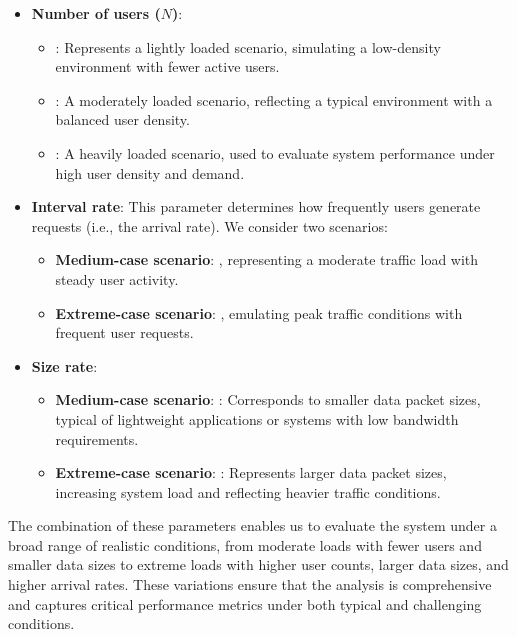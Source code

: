 \documentclass{report}
\begin{document}
\begin{itemize}
    \item \textbf{Number of users ($N$)}:
    \begin{itemize}
        \item {}: Represents a lightly loaded scenario, simulating a low-density environment with fewer active users.
        \item {}: A moderately loaded scenario, reflecting a typical environment with a balanced user density.
        \item {}: A heavily loaded scenario, used to evaluate system performance under high user density and demand.
    \end{itemize}
    \item \textbf{Interval rate}: This parameter determines how frequently users generate requests (i.e., the arrival rate). We consider two scenarios:
    \begin{itemize}
        \item \textbf{Medium-case scenario}: , representing a moderate traffic load with steady user activity.
        \item \textbf{Extreme-case scenario}: , emulating peak traffic conditions with frequent user requests.
    \end{itemize}
    \item \textbf{Size rate}:
    \begin{itemize}
        \item \textbf{Medium-case scenario}: : Corresponds to smaller data packet sizes, typical of lightweight applications or systems with low bandwidth requirements.
        \item \textbf{Extreme-case scenario}: : Represents larger data packet sizes, increasing system load and reflecting heavier traffic conditions.
    \end{itemize}
\end{itemize}
The combination of these parameters enables us to evaluate the system under a broad range of realistic conditions, from moderate loads with fewer users and smaller data sizes to extreme loads with higher user counts, larger data sizes, and higher arrival rates. These variations ensure that the analysis is comprehensive and captures critical performance metrics under both typical and challenging conditions.
\end{document}
